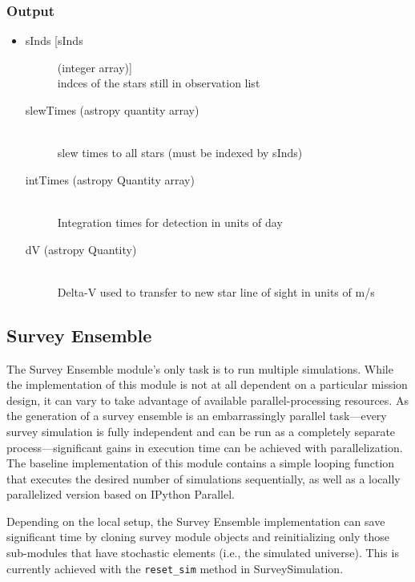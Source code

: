 \documentclass[cleanfoot]{asme2ej}
\begin{document}
\subsubsection*{Output}
\begin{itemize}
\item
\begin{description}
    \item[sInds [sInds] (integer array)] \hfill \\ indces of the stars still in observation list
    \item[slewTimes (astropy quantity array)] \hfill \\ slew times to all stars (must be indexed by sInds)
    \item[intTimes (astropy Quantity array)] \hfill \\ Integration times for detection in units of day
    \item[dV (astropy Quantity)] \hfill \\ Delta-V used to transfer to new star line of sight in units of m/s
    
\end{description}
\end{itemize}


\subsection{Survey Ensemble}
The Survey Ensemble module's only task is to run multiple simulations.  While the implementation of this module is not at all dependent on a particular mission design, it can vary to take advantage of available parallel-processing resources.  As the generation of a survey ensemble is an embarrassingly parallel task---every survey simulation is fully independent and can be run as a completely separate process---significant gains in execution time can be achieved with parallelization.  The baseline implementation of this module contains a simple looping function that executes the desired number of simulations sequentially, as well as a locally parallelized version based on IPython Parallel.

Depending on the local setup, the Survey Ensemble implementation can save significant time by cloning survey module objects and reinitializing only those sub-modules that have stochastic elements (i.e., the simulated universe). This is currently achieved with the \verb+reset_sim+ method in SurveySimulation.
\end{document}
